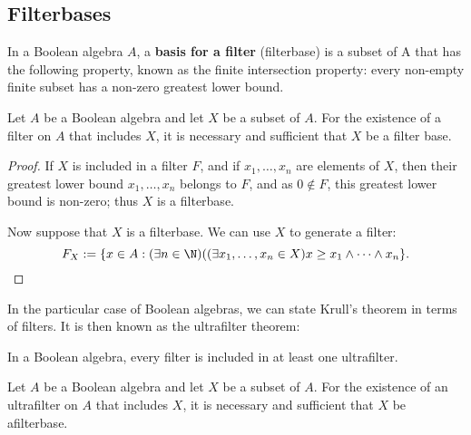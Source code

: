 \subsection{Filterbases}
\begin{definition}
In a Boolean algebra $A$, a \textbf{basis for a filter} (filterbase) is a subset of A that has the following property, known as the finite intersection property: every non-empty finite 
subset has a non-zero greatest lower bound.
\end{definition}
\begin{lemma}\label{Bool ring filter contain}
Let $A$ be a Boolean algebra and let $X$ be a subset of $A$. For the existence of a filter on $A$ that includes $X$, it is necessary and sufficient that $X$ be a filter base.
\end{lemma}
\begin{proof}
If $X$ is included in a filter $F$, and if $x_1,\dots,x_n$ are elements of $X$, then their greatest lower bound $x_1,\dots,x_n$ belongs to $F$, and as $0\notin F$, this greatest 
lower bound is non-zero; thus $X$ is a filterbase.\par
Now suppose that $X$ is a filterbase. We can use $X$ to generate a filter:
\[F_X:=\{x\in A:(\exists n\in\N)((\exists x_1,\dots,x_n\in X)x\geq x_1\wedge\cdots\wedge x_n\}.\]
\end{proof}
In the particular case of Boolean algebras, we can state Krull's theorem in terms of filters. It is then known as the ultrafilter theorem:
\begin{theorem}
In a Boolean algebra, every filter is included in at least one ultrafilter.
\end{theorem}
\begin{lemma}\label{Bool ring ultrafilter contain}
Let $A$ be a Boolean algebra and let $X$ be a subset of $A$. For the existence of an ultrafilter on $A$ that includes $X$, it is necessary and sufficient that $X$ be afilterbase.
\end{lemma}
